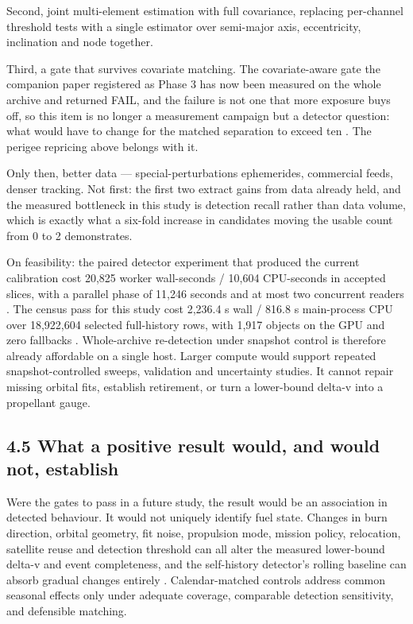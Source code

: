 \documentclass[11pt]{article}
\begin{document}
Second, joint multi-element estimation with full covariance, replacing per-channel threshold tests with a single estimator over semi-major axis, eccentricity, inclination and node together.

Third, a gate that survives covariate matching. The covariate-aware gate the companion paper registered as Phase 3 has now been measured on the whole archive and returned FAIL, and the failure is not one that more exposure buys off, so this item is no longer a measurement campaign but a detector question: what would have to change for the matched separation to exceed ten%
. The perigee repricing above belongs with it.

Only then, better data --- special-perturbations ephemerides, commercial feeds, denser tracking. Not first: the first two extract gains from data already held, and the measured bottleneck in this study is detection recall rather than data volume, which is exactly what a six-fold increase in candidates moving the usable count from 0 to 2 demonstrates.

On feasibility: the paired detector experiment that produced the current calibration cost 20,825 worker wall-seconds / 10,604 CPU-seconds in accepted slices, with a parallel phase of 11,246 seconds and at most two concurrent readers%
. The census pass for this study cost 2,236.4 s wall / 816.8 s main-process CPU over 18,922,604 selected full-history rows, with 1,917 objects on the GPU and zero fallbacks%
. Whole-archive re-detection under snapshot control is therefore already affordable on a single host. Larger compute would support repeated snapshot-controlled sweeps, validation and uncertainty studies. It cannot repair missing orbital fits, establish retirement, or turn a lower-bound delta-v into a propellant gauge.

\subsection*{4.5 What a positive result would, and would not, establish}

Were the gates to pass in a future study, the result would be an association in detected behaviour. It would not uniquely identify fuel state. Changes in burn direction, orbital geometry, fit noise, propulsion mode, mission policy, relocation, satellite reuse and detection threshold can all alter the measured lower-bound delta-v and event completeness, and the self-history detector's rolling baseline can absorb gradual changes entirely%
. Calendar-matched controls address common seasonal effects only under adequate coverage, comparable detection sensitivity, and defensible matching.
\end{document}
